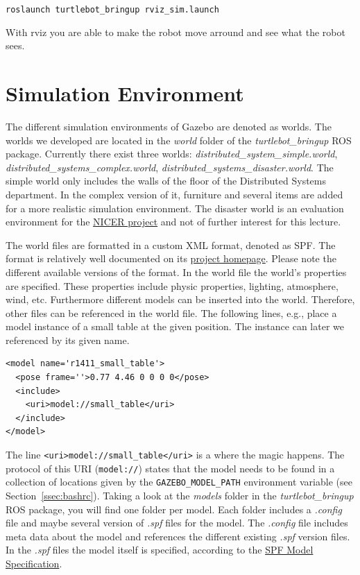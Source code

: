 \verb$roslaunch turtlebot_bringup rviz_sim.launch$

With rviz you are able to make the robot move arround and see what the robot sees.

\section{Simulation Environment}
\label{sec:SimulationEnvironment}

The different simulation environments of Gazebo are denoted as worlds. The worlds we developed are located in the \emph{world} folder of the \emph{turtlebot\_bringup} ROS package. Currently there exist three worlds: \emph{distributed\_system\_simple.world}, \emph{distributed\_sys\-tems\_com\-plex.world}, \emph{distributed\_systems\_disaster.world}. The simple world only includes the walls of the floor of the Distributed Systems department. In the complex version of it, furniture and several items are added for a more realistic simulation environment. The disaster world is an evaluation environment for the \href{http://www.uni-kassel.de/eecs/fachgebiete/vs/research/nicer.html}{NICER project} and not of further interest for this lecture. 

The world files are formatted in a custom XML format, denoted as SPF. The format is relatively well documented on its \href{http://sdformat.org}{project homepage}. Please note the different available versions of the format. In the world file the world's properties are specified. These properties include physic properties, lighting, atmosphere, wind, etc. Furthermore different models can be inserted into the world. Therefore, other files can be referenced in the world file. The following lines, e.g., place a model instance of a small table at the given position. The instance can later we referenced by its given name.

\begin{Verbatim}[fontsize=\small]
<model name='r1411_small_table'>
  <pose frame=''>0.77 4.46 0 0 0 0</pose>
  <include>
    <uri>model://small_table</uri>
  </include>
</model>
\end{Verbatim}

The line \verb$<uri>model://small_table</uri>$ is a where the magic happens. The protocol of this URI (\verb$model://$) states that the model needs to be found in a collection of locations given by the \verb$GAZEBO_MODEL_PATH$ environment variable (see Section~\ref{ssec:bashrc}). Taking a look at the \emph{models} folder in the \emph{turtlebot\_bringup} ROS package, you will find one folder per model. Each folder includes a \emph{.config} file and maybe several version of \emph{.spf} files for the model. The \emph{.config} file includes meta data about the model and references the different existing \emph{.spf} version files. In the \emph{.spf} files the model itself is specified, according to the \href{http://sdformat.org/spec?ver=1.6&elem=model}{SPF Model Specification}.

